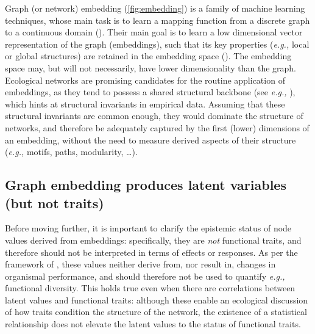 \begin{refsection}
Graph (or network) embedding (\autoref{fig:embedding}) is a family of machine
learning techniques, whose main task is to learn a mapping function from
a discrete graph to a continuous domain (\cite{Arsov2019Network,
Chami2022Machine}). Their main goal is to learn a low dimensional
vector representation of the graph (embeddings), such that its key
properties (\emph{e.g.,} local or global structures) are retained in the
embedding space (\cite{Yan2005Graph}). The embedding space may, but will
not necessarily, have lower dimensionality than the graph. Ecological
networks are promising candidates for the routine application of
embeddings, as they tend to possess a shared structural backbone (see
\emph{e.g.,} \cite{BramonMora2018Identifying}), which hints at structural
invariants in empirical data. Assuming that these structural invariants
are common enough, they would dominate the structure of networks, and
therefore be adequately captured by the first (lower) dimensions of an
embedding, without the need to measure derived aspects of their
structure (\emph{e.g.,} motifs, paths, modularity, \ldots).

\subsection{Graph embedding produces latent variables (but not
traits)}\label{graph-embedding-produces-latent-variables-but-not-traits}

Before moving further, it is important to clarify the epistemic status
of node values derived from embeddings: specifically, they are
\emph{not} functional traits, and therefore should not be interpreted in
terms of effects or responses. As per the framework of
\cite{Malaterre2019Functional}, these values neither derive from, nor result
in, changes in organismal performance, and should therefore not be used
to quantify \emph{e.g.,} functional diversity. This holds true even when
there are correlations between latent values and functional traits:
although these enable an ecological discussion of how traits condition
the structure of the network, the existence of a statistical
relationship does not elevate the latent values to the status of
functional traits.


\end{refsection}
